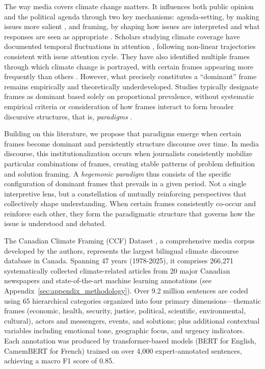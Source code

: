 \documentclass[12pt]{article}
\begin{document}
The way media covers climate change matters. It influences both public opinion and the political agenda through two key mechanisms: agenda-setting, by making issues more salient \autocite{mccombsAgendaSettingFunctionMass1972}, and framing, by shaping how issues are interpreted and what responses are seen as appropriate \autocite{chongFramingTheory2007}. Scholars studying climate coverage have documented temporal fluctuations in attention \autocite{schmidtMediaAttentionClimate2013, stoddartEndangeredArcticArctic2016, haseClimateChangeNews2021}, following non-linear trajectories consistent with \textcite{downsEcologytheIssueAttentionCycle1972} issue attention cycle. They have also identified multiple frames through which climate change is portrayed, with certain frames appearing more frequently than others \autocite{nisbetCommunicatingClimateChange2009, badullovichFramingClimateChange2020}. However, what precisely constitutes a ``dominant'' frame remains empirically and theoretically underdeveloped. Studies typically designate frames as dominant based solely on proportional prevalence, without systematic empirical criteria or consideration of how frames interact to form broader discursive structures, that is, \emph{paradigms} \autocite{oneillDominantFramesLegacy2015, stoddartEndangeredArcticArctic2016}.

Building on this literature, we propose that paradigms emerge when certain frames become dominant and persistently structure discourse over time. In media discourse, this institutionalization occurs when journalists consistently mobilize particular combinations of frames, creating stable patterns of problem definition and solution framing. A \emph{hegemonic paradigm} thus consists of the specific configuration of dominant frames that prevails in a given period. Not a single interpretive lens, but a constellation of mutually reinforcing perspectives that collectively shape understanding. When certain frames consistently co-occur and reinforce each other, they form the paradigmatic structure that governs how the issue is understood and debated.

The Canadian Climate Framing (CCF) Dataset \autocite{lemorCCFDatabaseMachineLearningPreprocessed}, a comprehensive media corpus developed by the authors, represents the largest bilingual climate discourse database in Canada. Spanning 47 years (1978-2025), it comprises 266,271 systematically collected climate-related articles from 20 major Canadian newspapers and state-of-the-art machine learning annotations (see Appendix~\ref{sec:appendix_methodology}). Over 9.2 million sentences are coded using 65 hierarchical categories organized into four primary dimensions—thematic frames (economic, health, security, justice, political, scientific, environmental, cultural), actors and messengers, events, and solutions; plus additional contextual variables including emotional tone, geographic focus, and urgency indicators. Each annotation was produced by transformer-based models (BERT for English, CamemBERT for French) trained on over 4,000 expert-annotated sentences, achieving a macro F1 score of 0.85.
\end{document}

